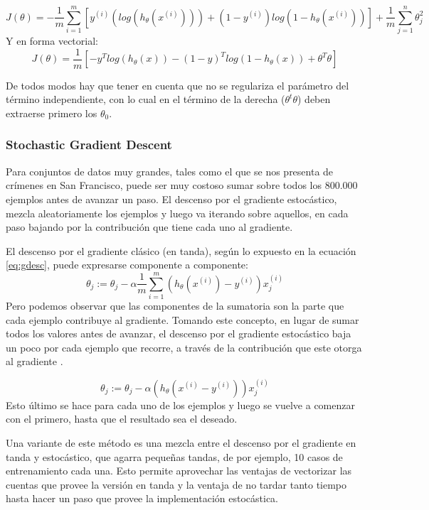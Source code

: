 \begin{equation}
J(\theta) = -\frac{1}{m}\sum_{i = 1}^{m}\left[y^{(i)}(log(h_\theta(x^{(i)}))) + (1-y^{(i)})log(1-h_\theta(x^{(i)}))\right] + \frac{1}{m}\sum_{j = 1}^{n}\theta_j^2
\end{equation}
Y en forma vectorial:
\begin{equation}
J(\theta) = \frac{1}{m}\left[ -y^Tlog(h_\theta(x)) - (1-y)^Tlog(1-h_\theta(x)) + \theta^T\theta\right]
\end{equation}

De todos modos hay que tener en cuenta que no se regulariza el parámetro del término independiente, con lo cual en el término de la derecha ($\theta^t\theta$) deben extraerse primero los $\theta_0$.

\subsubsection{Stochastic Gradient Descent}
Para conjuntos de datos muy grandes, tales como el que se nos presenta de crímenes en San Francisco, puede ser muy costoso sumar sobre todos los 800.000 ejemplos antes de avanzar un paso. El descenso por el gradiente estocástico, mezcla aleatoriamente los ejemplos y luego va iterando sobre aquellos, en cada paso bajando por la contribución que tiene cada uno al gradiente.

El descenso por el gradiente clásico (en tanda), según lo expuesto en la ecuación \ref{eq:gdesc}, puede expresarse componente a componente:
\begin{equation}
\theta_j := \theta_j - \alpha\frac{1}{m}\sum_{i = 1}^{m}(h_\theta(x^{(i)}) - y^{(i)})x_j^{(i)}
\end{equation}
Pero podemos observar que las componentes de la sumatoria son la parte que cada ejemplo contribuye al gradiente. Tomando este concepto, en lugar de sumar todos los valores antes de avanzar, el descenso por el gradiente estocástico baja un poco por cada ejemplo que recorre, a través de la contribución que este otorga al gradiente \cite{andrewStock}.

\begin{equation}
\theta_j := \theta_j - \alpha(h_\theta(x^{(i)}-y^{(i)}))x_j^{(i)}
\end{equation}
Esto último se hace para cada uno de los ejemplos y luego se vuelve a comenzar con el primero, hasta que el resultado sea el deseado.

Una variante de este método es una mezcla entre el descenso por el gradiente en tanda y estocástico, que agarra pequeñas tandas, de por ejemplo, 10 casos de entrenamiento cada una. Esto permite aprovechar las ventajas de vectorizar las cuentas que provee la versión en tanda y la ventaja de no tardar tanto tiempo hasta hacer un paso que provee la implementación estocástica.

